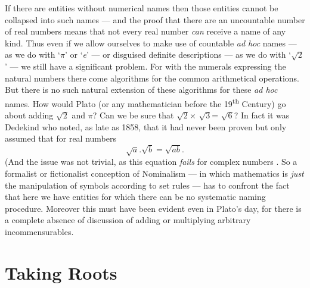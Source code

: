 \documentclass[11pt,oneside,a4paper]{article}
\newcommand*{\sqrtwo}{\ensuremath{\sqrt{2}}\hspace{0.5ex}\xspace}
\newcommand{\sqrthree}{\ensuremath{\sqrt{3}}\hspace{0.5ex}\xspace}
\newcommand{\name}[1]{\hspace{0.5ex}`\textit{#1}\hspace{0.45ex}'\hspace{0.55ex}\xspace}
\begin{document}
If there are entities without numerical names then those entities cannot be collapsed into such names --- and the proof that there are an uncountable number of real numbers means that not every real number \textit{can} receive a name of any kind. Thus even if we allow ourselves to make use of countable \textit{ad hoc} names --- as we do with `$\pi$' or \name{e} --- or disguised definite descriptions --- as we do with `\sqrtwo' --- we still have a significant problem. For with the numerals expressing the natural numbers there come algorithms for the common arithmetical operations. But there is no such natural extension of these algorithms for these \textit{ad hoc} names. How would Plato (or any mathematician before the 19\textsuperscript{th} Century) go about adding \sqrtwo and $\pi$? Can we be sure that \sqrtwo $\times$ \sqrthree = $\sqrt{6}$? In fact it was Dedekind who noted, as late as 1858, that it had never been proven but only assumed that for real numbers
$$\sqrt{a} . \sqrt{b} = \sqrt{ab}.$$
(And the issue was not trivial, as this equation \textit{fails} for complex numbers \parencite[see][]{waterhouse_square_2012}. So a formalist or fictionalist conception of Nominalism --- in which mathematics is \textit{just} the manipulation of symbols according to set rules --- has to confront the fact that here we have entities for which there can be no systematic naming procedure. Moreover this must have been evident even in Plato's day, for there is a complete absence of discussion of adding or multiplying arbitrary incommensurables.

\section{Taking Roots}
\end{document}
